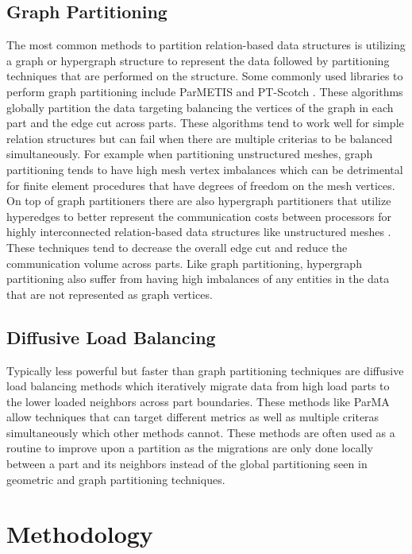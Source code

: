 \documentclass[a4paper]{article}
\begin{document}
\subsection{Graph Partitioning}
The most common methods to partition relation-based data structures is utilizing a graph or hypergraph structure to represent the data followed by partitioning techniques that are performed on the structure. Some commonly used libraries to perform graph partitioning include ParMETIS \cite{parmetis4} and PT-Scotch \cite{scotch2009}. These algorithms globally partition the data targeting balancing the vertices of the graph in each part and the edge cut across parts. These algorithms tend to work well for simple relation structures but can fail when there are multiple criterias to be balanced simultaneously. For example when partitioning unstructured meshes, graph partitioning tends to have high mesh vertex imbalances which can be detrimental for finite element procedures that have degrees of freedom on the mesh vertices. \\
On top of graph partitioners there are also hypergraph partitioners that utilize hyperedges to better represent the communication costs between processors for highly interconnected relation-based data structures like unstructured meshes \cite{devine2002zoltan}. These techniques tend to decrease the overall edge cut and reduce the communication volume across parts. Like graph partitioning, hypergraph partitioning also suffer from having high imbalances of any entities in the data that are not represented as graph vertices. 

\subsection{Diffusive Load Balancing}
Typically less powerful but faster than graph partitioning techniques are diffusive load balancing methods which iteratively migrate data from high load parts to the lower loaded neighbors across part boundaries. These methods like ParMA \cite{Smith2015} allow techniques that can target different metrics as well as multiple criteras simultaneously which other methods cannot. These methods are often used as a routine to improve upon a partition as the migrations are only done locally between a part and its neighbors instead of the global partitioning seen in geometric and graph partitioning techniques.

\section{Methodology}
\end{document}
